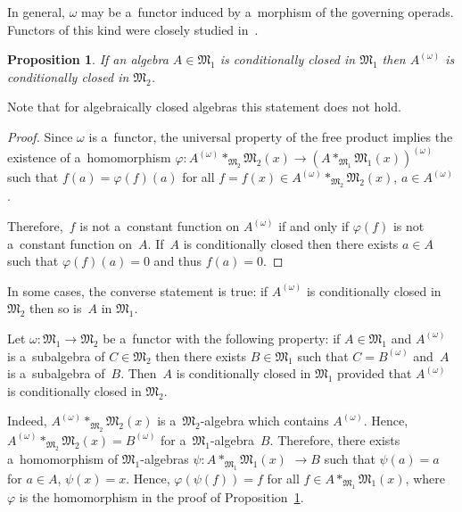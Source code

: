 \documentclass[11pt]{article}
\newtheorem{proposition}{Proposition}
\begin{document}
In general, $\omega $ may be a~functor induced by a~morphism of the governing operads.
Functors of this kind were closely studied in~\cite{MikSh2013}.

\begin{proposition}
\label{prop:CCFunctor}
If an algebra $A\in \mathfrak M_1$ is conditionally closed in $\mathfrak M_1$ then $A^{(\omega)}$ is conditionally
closed in $\mathfrak M_2$.
\end{proposition}

Note that for algebraically closed algebras this statement does not hold.

\begin{proof}
Since $\omega $ is a~functor, the universal property of the free product implies the existence of a~homomorphism
$\varphi: A^{(\omega)}*_{\mathfrak M_2} \mathfrak M_2(x) \to (A*_{\mathfrak M_1} \mathfrak M_1(x))^{(\omega)} $ such
that $f(a)=\varphi(f)(a)$ for all $f=f(x)\in A^{(\omega)}*_{\mathfrak M_2} \mathfrak M_2(x)$, $a\in A^{(\omega)}$.

Therefore,~$f$ is not a~constant function on $A^{(\omega)}$ if and only if $\varphi(f)$ is not a~constant function
on~$A$.
If~$A$ is conditionally closed then there exists $a\in A$ such that $\varphi(f)(a)=0$ and thus $f(a)=0$.
\end{proof}

In some cases, the converse statement is true: if $A^{(\omega)}$ is conditionally closed in $\mathfrak M_2$ then so
is~$A$ in $\mathfrak M_1$.

\begin{remark}
\label{rem:CCAlgebras_const}
Let $\omega: \mathfrak M_1 \to \mathfrak M_2$ be a~functor with the following property: if $A\in \mathfrak M_1$ and
$A^{(\omega)}$ is a~subalgebra of $C\in \mathfrak M_2$ then there exists $B\in \mathfrak M_1$ such that $C=B^{(\omega)}$
and~$A$ is a~subalgebra of~$B$.
Then~$A$ is conditionally closed in $\mathfrak M_1$ provided that $A^{(\omega)}$ is conditionally closed in $\mathfrak
M_2$.
\end{remark}

Indeed, $A^{(\omega)}*_{\mathfrak M_2} \mathfrak M_2(x)$ is a~$\mathfrak M_2$-algebra which contains $A^{(\omega)}$.
Hence, $A^{(\omega)}*_{\mathfrak M_2} \mathfrak M_2(x) = B^{(\omega)}$ for a~$\mathfrak M_1$-algebra~$B$.
Therefore, there exists a~homomorphism of $\mathfrak M_1$-algebras  $\psi: A*_{\mathfrak M_1} \mathfrak M_1(x) $ $\to B $
such that $\psi(a)=a$ for $a\in A$, $\psi(x)=x$.
Hence, $\varphi(\psi(f)) = f $ for all $f\in A*_{\mathfrak M_1} \mathfrak M_1(x)$, where~$\varphi $ is the homomorphism
in the proof of Proposition~\ref{prop:CCFunctor}.
\end{document}

